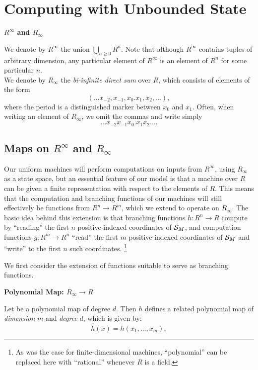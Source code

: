   \section{Computing with Unbounded State}

  \begin{definition}{\textbf{$R^\infty$ and $R_\infty$}}

    We denote by $R^\infty$ the union $\bigcup_{n \geq 0} R^n$. Note
    that although $R^\infty$ contains tuples of arbitrary dimension,
    any particular element of $R^\infty$ is an element of $R^n$ for
    some particular $n$.\\

    We denote by $R_\infty$ the \emph{bi-infinite direct sum} over
    $R$, which consists of elements of the form $$(\ldots x_{-2},
    x_{-1}, x_0.x_1, x_2, \ldots),$$ where the period is a
    distinguished marker between $x_0$ and $x_1$.  Often, when writing
    an element of $R_\infty$, we omit the commas and write simply
    $$\ldots x_{-2}x_{-1}x_0.x_1x_2 \ldots.$$
  \end{definition}

  \subsection{Maps on $R^\infty$ and $R_\infty$}
    
  Our uniform machines will perform computations on inputs from
  $R^\infty$, using $R_\infty$ as a state space, but an essential
  feature of our model is that a machine over $R$ can be given a
  finite representation with respect to the elements of $R$.  This
  means that the computation and branching functions of our machines
  will still effectively be functions from $R^n \rightarrow R^m$,
  which we extend to operate on $R_\infty$.  The basic idea behind
  this extension is that branching functions $h: R^n \rightarrow R$
  compute by ``reading'' the first $n$ positive-indexed coordinates of
  $\mathcal{S}_M$, and computation functions $g: R^m \rightarrow R^n$
  ``read'' the first $m$ positive-indexed coordinates of
  $\mathcal{S}_M$ and ``write'' to the first $n$ such
  coordinates. \footnote{As was the case for finite-dimensional
    machines, ``polynomial'' can be replaced here with ``rational''
    whenever $R$ is a field.}

  We first consider the extension of functions suitable to serve as
  branching functions.  

  \begin{definition}{\textbf{Polynomial Map: $R_\infty \rightarrow R$}}
    
    Let  be a polynomial map of degree $d$.  Then
    $h$ defines a related polynomial map
     of \emph{dimension} $m$ and
    \emph{degree} $d$, which is given by:
    $$\widehat{h}(x) = h(x_1, \ldots, x_m),$$
  \end{definition}

